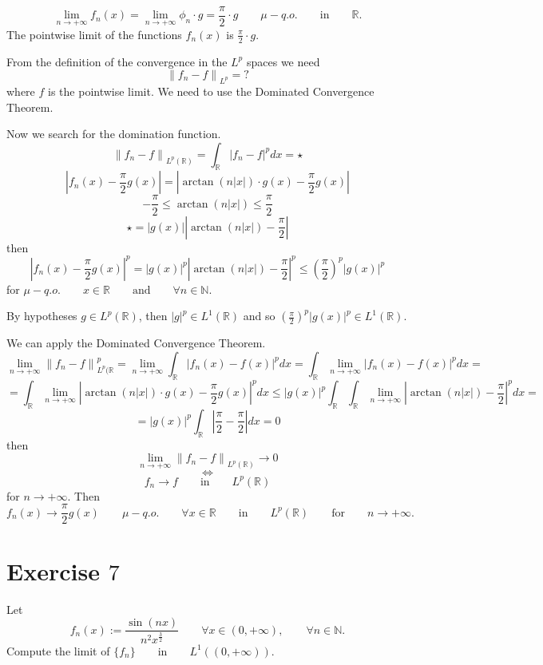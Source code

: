 \documentclass[a4paper, twoside, openany]{book}
\newcommand{\N}{\mathbb{N}}
\newcommand{\R}{\mathbb{R}}
\newcommand{\norm}[1]{\left\lVert#1\right\rVert}
\begin{document}
$$\lim_{n \rightarrow +\infty} f_n(x) = \lim_{n \rightarrow + \infty} \phi_n \cdot g = \frac{\pi}{2} \cdot g \qquad \mu-q.o. \qquad \textrm{in} \qquad \R.$$
The pointwise limit of the functions $f_n(x)$ is $\frac{\pi}{2} \cdot g.$ \par 
From the definition of the convergence in the $L^p$ spaces we need 
$$\norm{f_n - f}_{L^p} = ?$$
where $f$ is the pointwise limit. We need to use the Dominated Convergence Theorem. \par 
Now we search for the domination function.
$$\norm{f_n - f}_{L^p(\R)} = \int_{\R} |f_n - f|^p dx = \star$$
$$|f_n(x) - \frac{\pi}{2}g(x)| = |\arctan(n|x|) \cdot g(x) - \frac{\pi}{2} g(x)|$$
$$-\frac{\pi}{2} \leq \arctan{(n|x|)} \leq \frac{\pi}{2}$$
$$\star = |g(x)| |\arctan{(n|x|)} - \frac{\pi}{2}|$$
then
$$|f_n(x) - \frac{\pi}{2} g(x)|^p = |g(x)|^p |\arctan{(n|x|)} - \frac{\pi}{2}|^p \leq (\frac{\pi}{2})^p |g(x)|^p$$
for $\mu-q.o. \qquad x \in \R \qquad \textrm{and} \qquad \forall n \in \N$. \par
\vspace{0.5 cm}    
By hypotheses $g \in L^p(\R)$, then $|g|^p \in L^1(\R)$ and so $(\frac{\pi}{2})^p |g(x)|^p \in L^1(\R)$. \par 
\vspace{0.5 cm}
We can apply the Dominated Convergence Theorem.
$$\lim_{n \rightarrow +\infty} \norm{f_n - f}_{L^p(\R}^p = \lim_{n \rightarrow +\infty} \int_{\R} |f_n(x) - f(x)|^p dx = \int_{\R} \lim_{n \rightarrow +\infty} |f_n(x) - f(x)|^p dx = $$
$$= \int_{\R} \lim_{n \rightarrow +\infty} |\arctan{(n |x|)} \cdot g(x) - \frac{\pi}{2} g(x)|^p dx \leq |g(x)|^p \int_{\R} \int_{\R} \lim_{n \rightarrow +\infty} |\arctan{(n |x|)} - \frac{\pi}{2}|^p dx = $$
$$= |g(x)|^p \int_{\R} |\frac{\pi}{2} - \frac{\pi}{2}| dx = 0$$
then
$$\lim_{n \rightarrow +\infty} \norm{f_n - f}_{L^p(\R)} \rightarrow 0$$
$$\iff$$
$$f_n \rightarrow f \qquad \textrm{in} \qquad L^p(\R)$$
for $n \rightarrow +\infty$. Then
$$f_n(x) \rightarrow \frac{\pi}{2} g(x) \qquad \mu-q.o. \qquad \forall x \in \R \qquad \textrm{in} \qquad L^p(\R) \qquad \textrm{for} \qquad n \rightarrow +\infty .$$
\clearpage
\section*{Exercise $7$}
Let 
$$f_n(x) := \frac{\sin(nx)}{n^2 x^{\frac{3}{2}}} \qquad \forall x \in (0, +\infty), \qquad \forall n \in \N.$$
Compute the limit of $\{ f_n \} \qquad \textrm{in} \qquad L^1((0, + \infty))$. 
\end{document}
